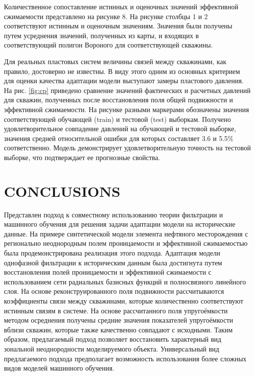\documentclass{article}
\begin{document}
Количественное сопоставление истинных и оценочных значений эффективной сжимаемости представлено на рисунке 8. На рисунке столбцы 1 и 2 соответствуют истинным и оценочным значениям. Значения были получены путем усреднения значений, полученных из карты, и входящих в соответствующий полигон Вороного для соответствующей скважины. 


Для реальных пластовых систем величины связей между скважинами, как правило, достоверно не известны. В виду этого одним из основных критерием для оценки качества адаптации модели выступают замеры пластового давления. На рис. \ref{fig:cp} приведено сравнение значений фактических и расчетных давлений для скважин, полученных после восстановления поля общей подвижности и эффективной сжимаемости. На рисунке разными маркерами обозначены значения соответствующей обучающей (train) и тестовой (test) выборкам. Получено удовлетворительное совпадение давлений на обучающей и тестовой выборке, значения средней относительной ошибки для которых составляет 3.6 и 5.5\% соответственно. Модель демонстрирует удовлетворительную точность на тестовой выборке, что подтверждает ее прогнозные свойства.

\section{CONCLUSIONS}

Представлен подход к совместному использованию теории фильтрации и машинного обучения для решения задачи адаптации модели на исторические данные. На примере синтетической модели элемента нефтяного месторождения с регионально неоднородным полем проницаемости и эффективной сжимаемостью была продемонстрирована реализация этого подхода. Адаптация модели однофазной фильтрации к историческим данным была достигнута путем восстановления полей проницаемости и эффективной сжимаемости с использованием сети радиальных базисных функций и полносвязного линейного слоя. На основе реконструированного поля подвижности рассчитываются коэффициенты связи между скважинами, которые количественно соответствуют истинным связям в системе. На основе рассчитанного поля упругоёмкости методом осреднения получены средние значения показателей упругоёмкости вблизи скважин, которые также качественно совпадают с исходными. Таким образом, предлагаемый подход позволяет восстановить характерный вид зональной неоднородности моделируемого объекта. Универсальный вид предлагаемого подхода предполагает возможность использования более сложных видов моделей машинного обучения.
\end{document}
